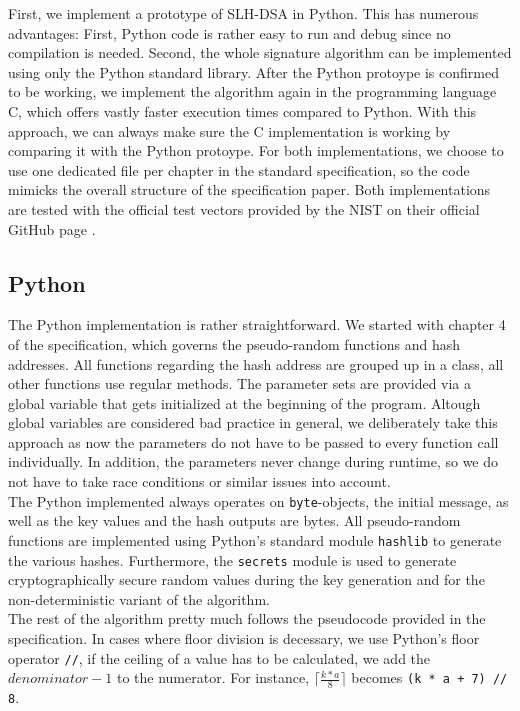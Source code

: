 \documentclass[journal=tosc,notanonymous]{iacrtrans}
\begin{document}
First, we implement a prototype of SLH-DSA in Python.
This has numerous advantages: First, Python code is rather easy to run and debug since no compilation is needed.
Second, the whole signature algorithm can be implemented using only the Python standard library.
After the Python protoype is confirmed to be working, we implement the algorithm again in the programming language C, which offers vastly faster execution times compared to Python.
With this approach, we can always make sure the C implementation is working by comparing it with the Python protoype.
For both implementations, we choose to use one dedicated file per chapter in the standard specification, so the code mimicks the overall structure of the specification paper.
Both implementations are tested with the official test vectors provided by the NIST on their official GitHub page \cite{usnistgov-2024}.


\subsection{Python}

The Python implementation is rather straightforward.
We started with chapter 4 of the specification, which governs the pseudo-random functions and hash addresses.
All functions regarding the hash address are grouped up in a class, all other functions use regular methods.
The parameter sets are provided via a global variable that gets initialized at the beginning of the program.
Altough global variables are considered bad practice in general, we deliberately take this approach as now the parameters do not have to be passed to every function call individually.
In addition, the parameters never change during runtime, so we do not have to take race conditions or similar issues into account.
\\
The Python implemented always operates on \texttt{byte}-objects, the initial message, as well as the key values and the hash outputs are bytes.
All pseudo-random functions are implemented using Python's standard module \texttt{hashlib} to generate the various hashes.
Furthermore, the \texttt{secrets} module is used to generate cryptographically secure random values during the key generation and for the non-deterministic variant of the algorithm.
\\
The rest of the algorithm pretty much follows the pseudocode provided in the specification.
In cases where floor division is decessary, we use Python's floor operator \texttt{//}, if the ceiling of a value has to be calculated, we add the $denominator - 1$ to the numerator.
For instance, $\lceil \frac{k * a}{8} \rceil$ becomes \texttt{(k * a + 7) // 8}.
\end{document}

